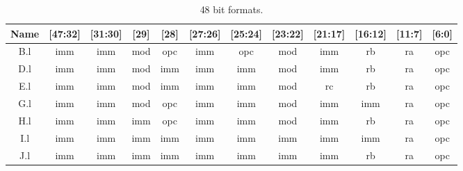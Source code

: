 \begin{table}[hbt!] %

    \begin{center}

    \begin{tabular}{|c|c|c|c|c|c|c|c|c|c|c|c|}

        \hline
        Name & [47:32] & [31:30] & [29] & [28] & [27:26] & [25:24] & [23:22] & [21:17] & [16:12] & [11:7] & [6:0]\\
        \hline
        \addlinespace[10pt]
        \hline
        B.l & imm & imm & mod & opc & imm & opc & mod & imm & rb & ra & opc \\
        \hline
        D.l & imm & imm & mod & imm & imm & imm & mod & imm & rb & ra & opc\\
        \hline
        E.l & imm & imm & mod & imm & imm & imm & mod & rc & rb & ra & opc\\
        \hline
        G.l & imm & imm & mod & opc & imm & imm & mod & imm & imm & ra & opc\\
        \hline
        H.l & imm & imm & imm & opc & imm & imm & mod & imm & rb & ra & opc\\
        \hline
        I.l & imm & imm & imm & imm & imm & imm & imm & imm & imm & ra & opc\\
        \hline
        J.l & imm & imm & imm & imm & imm & imm & imm & imm & rb & ra & opc\\
        \hline

    \end{tabular}

    \caption[48 bit formats]{48 bit formats.}

    \end{center}

\end{table}